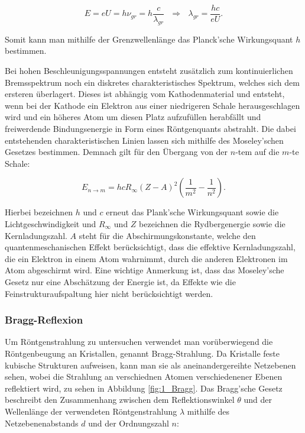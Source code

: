 \documentclass{article}
\begin{document}
\begin{equation}
    E = e U = h \nu_{gr} = h  \frac{c}{\lambda_{gr}} \ \ \ \Rightarrow \ \ \ \lambda_{gr} = \frac{h c}{e U}.
    \label{eq:1_LAMBDA_GR}
\end{equation}

Somit kann man mithilfe der Grenzwellenlänge das Planck'sche Wirkungsquant $h$ bestimmen. 

Bei hohen Beschleunigungsspannungen entsteht zusätzlich zum kontinuierlichen Bremsspektrum noch ein diskretes charakteristisches Spektrum, welches sich dem ersteren überlagert. Dieses ist abhängig vom Kathodenmaterial und entsteht, wenn bei der Kathode ein Elektron aus einer niedrigeren Schale herausgeschlagen wird und ein höheres Atom um diesen Platz aufzufüllen herabfällt und freiwerdende Bindungsenergie in Form eines Röntgenquants abstrahlt. Die dabei entstehenden charakteristischen Linien lassen sich mithilfe des Moseley'schen Gesetzes bestimmen. Demnach gilt für den Übergang von der $n$-tem auf die $m$-te Schale:

\begin{equation}
    E_{n \xrightarrow{} m} = hc R_\infty (Z-A)^2 \left( \frac{1}{m^2} - \frac{1}{n^2} \right).
\end{equation}

Hierbei bezeichnen $h$ und $c$ erneut das Plank'sche Wirkungsquant sowie die Lichtgeschwindigkeit und $R_\infty$ und $Z$ bezeichnen die Rydbergenergie sowie die Kernladungszahl. $A$ steht für die Abschirmungskonstante, welche den quantenmeschanischen Effekt berücksichtigt, dass die effektive Kernladungszahl, die ein Elektron in einem Atom wahrnimmt, durch die anderen Elektronen im Atom abgeschirmt wird. Eine wichtige Anmerkung ist, dass das Moseley'sche Gesetz nur eine Abschätzung der Energie ist, da Effekte wie die Feinstrukturaufspaltung hier nicht berücksichtigt werden.  

\subsubsection{Bragg-Reflexion}

Um Röntgenstrahlung zu untersuchen verwendet man vorüberwiegend die Röntgenbeugung an Kristallen, genannt Bragg-Strahlung. Da Kristalle feste kubische Strukturen aufweisen, kann man sie als aneinandergereihte Netzebenen sehen, wobei die Strahlung an verschiednen Atomen verschiedenener Ebenen reflektiert wird, zu sehen in Abbildung \ref{fig:1_Bragg}. Das Bragg'sche Gesetz beschreibt den Zusammenhang zwischen dem Reflektionswinkel $\theta$ und der Wellenlänge der verwendeten Röntgenstrahlung $\lambda$ mithilfe des Netzebenenabstands $d$ und der Ordnungszahl $n$:
\end{document}
